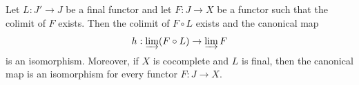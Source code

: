  Let $L : J' \to J$ be a final functor and let $F : J \to X$ be a functor such that the colimit of $F$ exists. Then the colimit of $F \circ L$ exists and the canonical map
$$
h : \varinjlim (F \circ L) \to \varinjlim F
$$
is an isomorphism. Moreover, if $X$ is cocomplete and $L$ is final, then the canonical map is an isomorphism for every functor $F : J \to X$.

